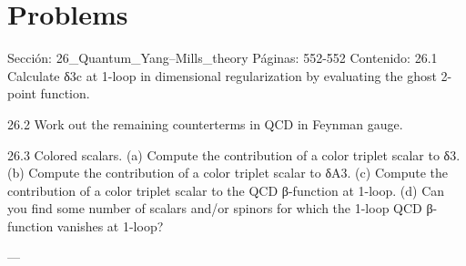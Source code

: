 \section*{Problems}
Sección: 26_Quantum_Yang–Mills_theory
Páginas: 552-552
Contenido:
26.1 Calculate δ3c at 1-loop in dimensional regularization by evaluating the ghost 2-point
function.

26.2 Work out the remaining counterterms in QCD in Feynman gauge.

26.3 Colored scalars.
(a) Compute the contribution of a color triplet scalar to δ3.
(b) Compute the contribution of a color triplet scalar to δA3.
(c) Compute the contribution of a color triplet scalar to the QCD β-function at
1-loop.
(d) Can you ﬁnd some number of scalars and/or spinors for which the 1-loop QCD
β-function vanishes at 1-loop?


---

